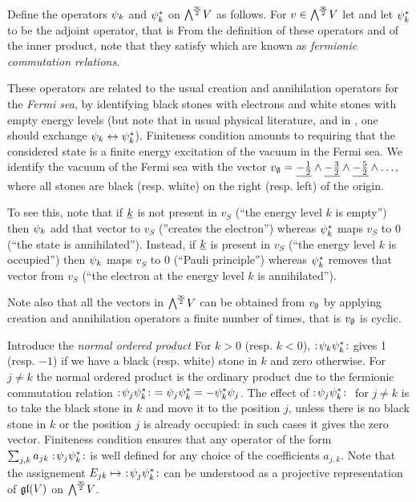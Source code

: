 \documentclass[../main/main.tex]{subfiles}
\begin{document}
Define the operators $\psi_k$ and $\psi_k^*$ on $\bigwedge^{\!\frac\infty2}\!V$ as follows. For $v\in\bigwedge^{\!\frac\infty2}\!V$ let
and let $\psi_k^*$ to be the adjoint operator, that is \st
{}
From the definition of these operators and of the inner product, note that they satisfy
which are known as \emph{fermionic commutation relations}. 

These operators are related to the usual creation and annihilation operators for the \emph{Fermi sea}, by identifying black stones with electrons and white stones with empty energy levels (but note that in usual physical literature, and in \cite{MJD}, one should exchange $\psi_k\leftrightarrow\psi_k^*$). Finiteness condition amounts to requiring that the considered state is a finite energy excitation of the vacuum in the Fermi sea. We identify the vacuum of the Fermi sea with the vector $v_\emptyset=\underline{-\frac12}\wedge\underline{-\frac32}\wedge\underline{-\frac52}\wedge\ldots$, where all stones are black (resp. white) on the right (resp. left) of the origin.

To see this, note that if $\underline{k}$ is not present in $v_S$ (``the energy level $k$ is empty'') then $\psi_k$ add that vector to $v_S$ (''creates the electron'') whereas $\psi_k^*$ maps $v_S$ to 0 (``the state is annihilated''). Instead, if $\underline{k}$ is present in $v_S$ (``the energy level $k$ is occupied'') then $\psi_k$ maps $v_S$ to 0 (``Pauli principle'') whereas $\psi_k^*$ removes that vector from $v_S$ (``the electron at the energy level $k$ is annihilated''). 

Note also that all the vectors in $\bigwedge^{\!\frac\infty2}\!V$ can be obtained from $v_\emptyset$ by applying creation and annihilation operators a finite number of times, that is $v_\emptyset$ is cyclic. 

Introduce the \emph{normal ordered product}
For $k>0$ (resp. $k<0$), $:\!{\psi_k\psi_k^*}\!:$ gives 1 (resp. $-1$) if we have a black (resp. white) stone in $k$ and zero otherwise. For $j\neq k$ the normal ordered product is the ordinary product due to the fermionic commutation relation $\no{\p_j\p_k^*}\ =\p_j\p_k^*=-\p_k^*\p_j$. The effect of $:\!{\psi_j\psi_k^*}\!:\ $ for $j\neq k$ is to take the black stone in $k$ and move it to the position $j$, unless there is no black stone in $k$ or the position $j$ is already occupied: in such cases it gives the zero vector. Finiteness condition ensures that any operator of the form $\sum_{j,k}a_{jk}:\!{\psi_j\psi_k^*}\!:$ is well defined for any choice of the coefficients $a_{j,k}$. Note that the assignement $E_{jk}\mapsto\ \no{\p_j\p_k^*}$ can be understood as a projective representation of $\mathfrak g\mathfrak l(V)$ on $\bigwedge^{\!\frac\infty2}\!V$. 
\end{document}
